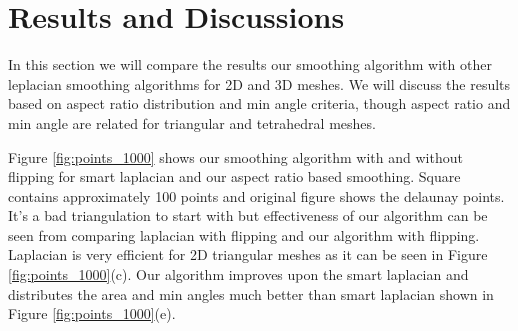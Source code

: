 \chapter{Results and Discussions}
In this section we will compare the results our smoothing algorithm with other leplacian smoothing algorithms for 2D and 3D meshes. We will discuss the results based on aspect ratio distribution and min angle criteria, though aspect ratio and min angle are related for triangular and tetrahedral meshes.

Figure \ref{fig:points_1000} shows our smoothing algorithm with and without flipping for smart laplacian and our aspect ratio based smoothing. Square contains approximately  100 points and original figure shows the delaunay points. It's a bad triangulation to start with but effectiveness of our algorithm can be seen from comparing laplacian with flipping and our algorithm with flipping. Laplacian is very efficient for 2D triangular meshes as it can be seen in Figure \ref{fig:points_1000}(c). Our algorithm improves upon the smart laplacian and distributes the area and min angles much  better than smart laplacian shown in Figure \ref{fig:points_1000}(e).

